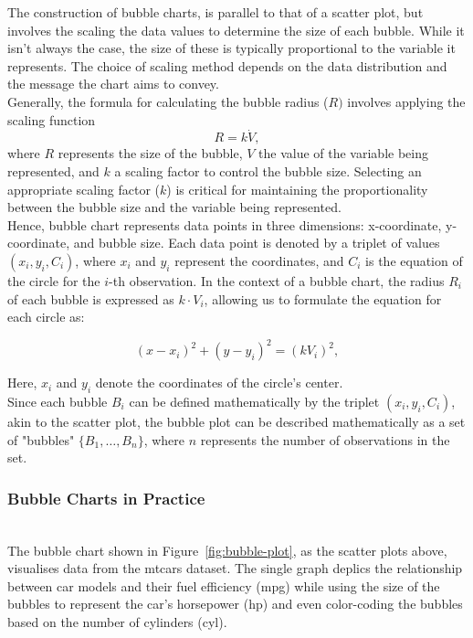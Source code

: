\documentclass{article}\usepackage[]{graphicx}\usepackage[]{xcolor}
\numberwithin{equation}{section}
\begin{document}
\noindent The construction of bubble charts, is parallel to that of a scatter plot, but involves the scaling the data values to determine the size of each bubble. While it isn't always the case, the size of these is typically proportional to the variable it represents. The choice of scaling method depends on the data distribution and the message the chart aims to convey.\\

\noindent Generally, the formula for calculating the bubble radius (\(R)\) involves applying the scaling function
\[
R = k \dot V,
\]
\noindent where \(R\) represents the size of the bubble, \(V\) the value of the variable being represented, and \(k\) a scaling factor to control the bubble size. Selecting an appropriate scaling factor (\(k\)) is critical for maintaining the proportionality between the bubble size and the variable being represented.\\ 

\noindent Hence, bubble chart represents data points in three dimensions: x-coordinate, y-coordinate, and bubble size. Each data point is denoted by a triplet of values \((x_i, y_i, C_i)\), where \(x_i\) and \(y_i\) represent the coordinates, and \(C_i\) is the equation of the circle for the \(i\)-th observation. In the context of a bubble chart, the radius \(R_i\) of each bubble is expressed as \(k \cdot V_i\), allowing us to formulate the equation for each circle as:

\[
(x - x_i)^2 + (y - y_i)^2 = (kV_i)^2 ,
\]

\noindent Here, \(x_i\) and \(y_i\) denote the coordinates of the circle's center.\\

\noindent Since each bubble \(B_i\) can be defined mathematically by the triplet \((x_i, y_i, C_i)\), akin to the scatter plot, the bubble plot can be described mathematically as a set of "bubbles" \( \{B_1, \ldots, B_n\}\), where \(n\) represents the number of observations in the set.\\

\noindent
\subsubsection{Bubble Charts in Practice}\\

\noindent The bubble chart shown in Figure~\ref{fig:bubble-plot}, as the scatter plots above, visualises data from the mtcars dataset. The single graph deplics the relationship between car models and their fuel efficiency (mpg) while using the size of the bubbles to represent the car's horsepower (hp) and even color-coding the bubbles based on the number of cylinders (cyl).\\
\end{document}
